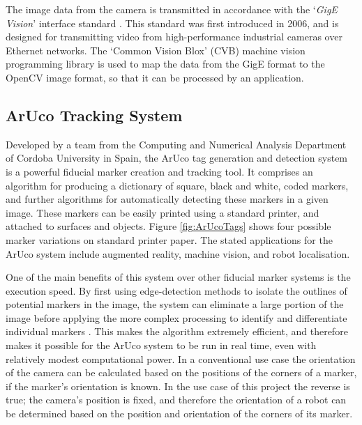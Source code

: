 The image data from the camera is transmitted in accordance with the `\textit{GigE Vision}' interface standard \cite{GigEVision}. This standard was first introduced in 2006, and is designed for transmitting video from high-performance industrial cameras over Ethernet networks. The `Common Vision Blox' (CVB) machine vision programming library is used to map the data from the GigE format to the OpenCV image format, so that it can be processed by an application.


\subsection{ArUco Tracking System} \label{ArUco}
Developed by a team from the Computing and Numerical Analysis Department of Cordoba University in Spain, the ArUco tag generation and detection system \cite{Garrido:2014} is a powerful fiducial marker creation and tracking tool. It comprises an algorithm for producing a dictionary of square, black and white, coded markers, and further algorithms for automatically detecting these markers in a given image. These markers can be easily printed using a standard printer, and attached to surfaces and objects. Figure \ref{fig:ArUcoTags} shows four possible marker variations on standard printer paper. The stated applications for the ArUco system include augmented reality, machine vision, and robot localisation.

One of the main benefits of this system over other fiducial marker systems is the execution speed. By first using edge-detection methods to isolate the outlines of potential markers in the image, the system can eliminate a large portion of the image before applying the more complex processing to identify and differentiate individual markers \cite{Garrido:2014}. This makes the algorithm extremely efficient, and therefore makes it possible for the ArUco system to be run in real time, even with relatively modest computational power. In a conventional use case the orientation of the camera can be calculated based on the positions of the corners of a marker, if the marker's orientation is known. In the use case of this project the reverse is true; the camera's position is fixed, and therefore the orientation of a robot can be determined based on the position and orientation of the corners of its marker.

